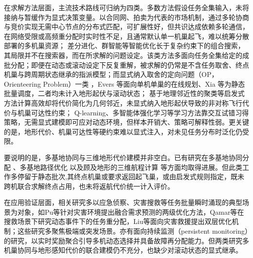 在求解方法层面，主流技术路线可归纳为四类。多数方法假设任务全集输入，未将接纳与暂缓作为显式决策变量。以合同网、拍卖为代表的市场机制\cite{zhang_survey_2026, hu2023survey, choi2009cbaa}，通过多轮协商与竞价实现无需中心节点的分布式匹配，可扩展性好，但共识达成依赖多轮通信，在网络受限或高频重分配时实时性不足，且通常默认单一机巢起飞，难以统筹分散部署的多机巢资源；
差分进化、群智能等智能优化\cite{zhang_survey_2026, zhao2017dmde, wang2023defl}长于复杂约束下的组合搜索，其局限并不在搜索器，而在所求解的问题设定。该类方法多面向任务全集给定的成批分配；即便在动态或滚动设定下反复重解，被求解的仍常是不含任务取舍、终点机巢与跨周期状态继承的指派模型；而显式纳入取舍的定向问题（OP，Orienteering Problem）一类 \cite {evers2014onlineuav, xia2019dronesaschedule}，Evers 等面向单机单巢的在线规划、Xia 等为静态批量调度，二者均未计入地形起伏与滚动状态；
基于地理邻近性的聚类等启发式方法\cite{zhang_survey_2026, hu2023survey}计算高效却将代价简化为几何邻近，未显式纳入地形起伏导致的非对称飞行代价与机巢可达性约束；
Q-learning、多智能体强化学习等学习方法\cite{zhu2021qlearn, liu2022matdta, alzboun2026madrluav}靠交互试错习得策略，无需显式建模即可应对动态环境，但样本开销大、策略可解释性弱。更关键的是，地形代价、机巢可达性等硬约束难以显式注入，对未见任务分布时泛化仍受限。

要说明的是，多基地协同与三维地形代价建模并非空白。已有研究在多基地协同分配 \cite {chen2025multidepot, ozkan2021multibase}、多基地路径优化 \cite {che2022mdalns} 以及顾及地形的三维航程计算 \cite {huang2023wafcrras, lu_energy-aware_2026, zaki2026dem} 等方面均取得进展。但此类工作多停留于静态批次,其终点机巢或要求返回起飞巢\cite{chen2025multidepot}，或由启发式规则指定\cite{li2021mdusr, che2022mdalns}，既未跨机联合求解终点占用，也未将返航代价统一计入评价。

在应用验证层面，相关研究多以应急侦察、灾害搜救等任务批量瞬时涌现的典型场景为对象，如Pu等\cite{pu_dynamic_2026}针对灾害环境提出融合需求预测的两级优化方法，Qamar等\cite{baig2026sar}在搜救场景下研究动态事件下的任务重分配，Liu等\cite{liu2024dawn}面向灾害救援提出双层优化机制；这些研究多聚焦极端或突发场景。亦有面向持续监测（persistent monitoring）的研究\cite{zhang2025persistent}，以实时奖励聚合引导多机动态选择并具备故障再分配能力。但两类研究多机巢协同与地形感知代价的联合建模仍不充分，也缺少对滚动状态的显式继承。



